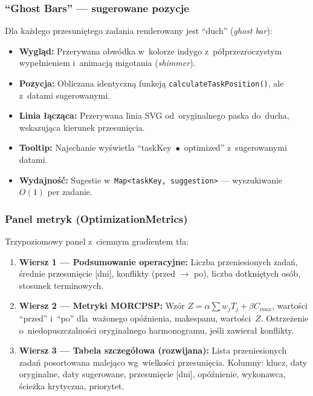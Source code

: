 \subsubsection{``Ghost Bars'' --- sugerowane pozycje}

Dla każdego przesuniętego zadania renderowany jest ``duch'' (\textit{ghost bar}):

\begin{itemize}
    \item \textbf{Wygląd:} Przerywana obwódka w~kolorze indygo z~półprzezroczystym wypełnieniem i~animacją migotania (\textit{shimmer}).
    \item \textbf{Pozycja:} Obliczana identyczną funkcją \texttt{calculateTaskPosition()}, ale z~datami sugerowanymi.
    \item \textbf{Linia łącząca:} Przerywana linia SVG od~oryginalnego paska do~ducha, wskazująca kierunek przesunięcia.
    \item \textbf{Tooltip:} Najechanie wyświetla ``taskKey~$\bullet$~optimized'' z~sugerowanymi datami.
    \item \textbf{Wydajność:} Sugestie w~\texttt{Map<taskKey, suggestion>} --- wyszukiwanie $O(1)$ per zadanie.
\end{itemize}

\subsubsection{Panel metryk (OptimizationMetrics)}

Trzypoziomowy panel z~ciemnym gradientem tła:

\begin{enumerate}
    \item \textbf{Wiersz 1 --- Podsumowanie operacyjne:} Liczba przeniesionych zadań, średnie przesunięcie [dni], konflikty (przed $\rightarrow$ po), liczba dotkniętych osób, stosunek terminowych.

    \item \textbf{Wiersz 2 --- Metryki MORCPSP:} Wzór $Z = \alpha \sum w_j T_j + \beta C_{max}$, wartości ``przed'' i~``po'' dla~ważonego opóźnienia, makespanu, wartości~$Z$. Ostrzeżenie o~niedopuszczalności oryginalnego harmonogramu, jeśli zawierał konflikty.

    \item \textbf{Wiersz 3 --- Tabela szczegółowa (rozwijana):} Lista przeniesionych zadań posortowana malejąco wg~wielkości przesunięcia. Kolumny: klucz, daty oryginalne, daty sugerowane, przesunięcie [dni], opóźnienie, wykonawca, ścieżka krytyczna, priorytet.
\end{enumerate}

